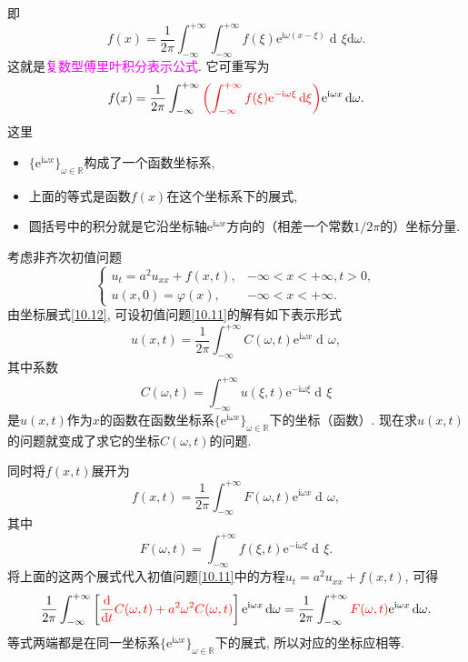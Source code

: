 \documentclass[aspectratio=169,notheorems,12pt,compress,UTF8]{ctexbeamer} %
\DeclareMathOperator\dif{d\!}
\def\R {\mathbb {R}}
\newcommand{\me}{\mathrm{e}}
\newcommand{\mi}{\mathrm{i}}
\begin{document}
\begin{frame}
即
$$
f(x)=\frac{1}{2\pi}\int_{-\infty}^{+\infty}\!\!\int_{-\infty}^{+\infty}
f(\xi)\me^{\mi\omega(x-\xi)}\dif\xi \mathrm{d}\omega.
$$
这就是\textcolor{magenta}{复数型傅里叶积分表示公式}. \pause 它可重写为
\begin{equation}\label{10.12}
f(x)=\frac{1}{2\pi}\int_{-\infty}^{+\infty}\textcolor{red}{\left(\int_{-\infty}^{+\infty}
f(\xi)\me^{-\mi\omega\xi}\dif\xi\right)}\me^{\mi\omega x}\dif\omega.
\end{equation}
这里
\begin{itemize}
\item $\{\me^{\mi\omega x}\}_{\omega\in \R}$构成了一个函数坐标系,
\item 上面的等式是函数$f(x)$在这个坐标系下的展式,
\item 圆括号中的积分就是它沿坐标轴$\me^{\mi\omega x}$方向的（相差一个常数$1/2\pi$的）坐标分量.
\end{itemize}


\end{frame}

\begin{frame}
\qquad 考虑非齐次初值问题
\begin{equation}\label{10.11}
\left\{
\begin{array}{ll}
u_{t}=a^2u_{xx}+f(x,t), & -\infty<x<+\infty,t>0,\\
u(x,0)=\varphi(x), & -\infty<x<+\infty.
\end{array}\right.
\end{equation}\pause
\qquad 由坐标展式\eqref{10.12}, 可设初值问题\eqref{10.11}的解有如下表示形式
$$
u(x,t)=\frac{1}{2\pi}\int_{-\infty}^{+\infty}C(\omega,t)\me^{\mi\omega x}\dif\omega,
$$
其中系数
$$
C(\omega,t)=\int_{-\infty}^{+\infty}u(\xi,t)\me^{-\mi\omega \xi}\dif\xi
$$
是$u(x,t)$作为$x$的函数在函数坐标系$\{\me^{\mi\omega x}\}_{\omega\in \R}$下的坐标（函数）. \pause
现在求$u(x,t)$的问题就变成了求它的坐标$C(\omega,t)$的问题.
\end{frame}

\begin{frame}
\qquad 同时将$f(x,t)$展开为
$$
f(x,t)=\frac{1}{2\pi}\int_{-\infty}^{+\infty}F(\omega,t)\me^{\mi\omega
x}\dif\omega,
$$
其中
$$
F(\omega,t)=\int_{-\infty}^{+\infty}f(\xi,t)\me^{-\mi\omega \xi}\dif\xi.
$$\pause
将上面的这两个展式代入初值问题\eqref{10.11}中的方程$u_t=a^2u_{xx}+f(x,t)$, 可得
$$
\frac{1}{2\pi}\int_{-\infty}^{+\infty}\left[\textcolor{red}{\frac{\mathrm{d}}{\mathrm{d}t}C(\omega,t)+a^2\omega^2C(\omega,t)}\right]
\me^{\mi\omega x}\dif\omega=\frac{1}{2\pi}\int_{-\infty}^{+\infty} \textcolor{red}{F(\omega,t)}\me^{\mi\omega
x}\dif\omega.
$$\pause
等式两端都是在同一坐标系$\{\me^{\mi\omega x}\}_{\omega\in \R}$下的展式, 所以对应的坐标应相等.
\end{frame}
\end{document}
